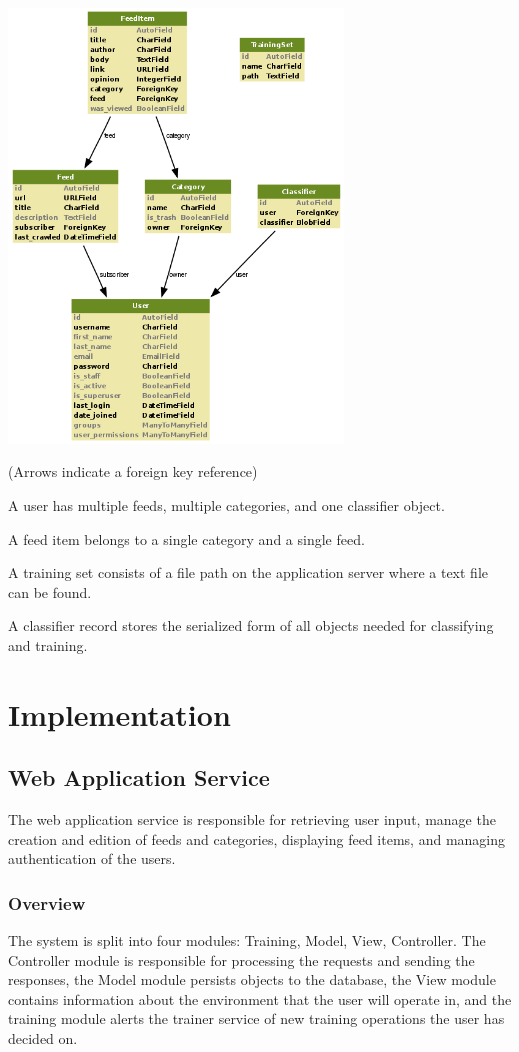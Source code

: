 \documentclass[letterpaper]{article}
\begin{document}
\noindent\includegraphics[width=3.5in]{db-diagram-no-transparency.png}

(Arrows indicate a foreign key reference)

A user has multiple feeds, multiple categories, and one classifier object.

A feed item belongs to a single category and a single feed.

A training set consists of a file path on the application server where a text file can be found.

A classifier record stores the serialized form of all objects needed for classifying and training.

\section{Implementation}
\subsection{Web Application Service}
The web application service is responsible for retrieving user input, manage the creation and edition of feeds and categories, displaying feed items, and managing authentication of the users.

\subsubsection{Overview}
The system is split into four modules: Training, Model, View, Controller.  The Controller module is responsible for processing the requests and sending the responses, the Model module persists objects to the database, the View module contains information about the environment that the user will operate in, and the training module alerts the trainer service of new training operations the user has decided on. 
\end{document}
